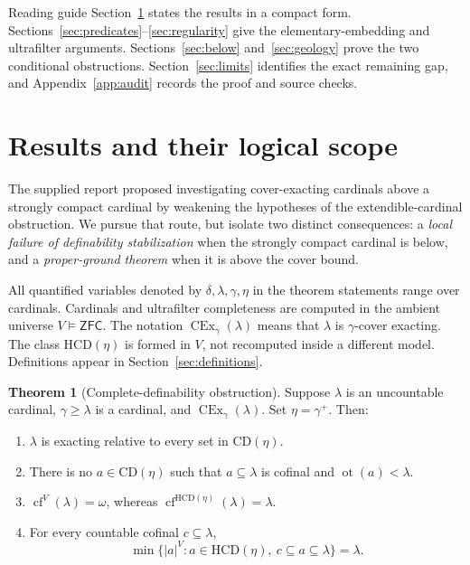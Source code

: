 \documentclass[11pt,letterpaper]{article}
\theoremstyle{definition}
\newtheorem{theorem}[definition]{Theorem}
\newcommand{\ZFC}{\mathsf{ZFC}}
\newcommand{\CEx}{\operatorname{CEx}}
\newcommand{\cf}{\operatorname{cf}}
\newcommand{\ot}{\operatorname{ot}}
\newcommand{\CD}{\mathrm{CD}}
\newcommand{\HCD}{\mathrm{HCD}}
\begin{document}
\clearpage
\tableofcontents
\vspace{10pt}
\begin{assessment}{Reading guide}
Section~\ref{sec:results} states the results in a compact form. Sections~\ref{sec:predicates}--\ref{sec:regularity} give the elementary-embedding and ultrafilter arguments. Sections~\ref{sec:below} and~\ref{sec:geology} prove the two conditional obstructions. Section~\ref{sec:limits} identifies the exact remaining gap, and Appendix~\ref{app:audit} records the proof and source checks.
\end{assessment}

\clearpage
\section{Results and their logical scope}\label{sec:results}

The supplied report \cite{supplied} proposed investigating cover-exacting cardinals above a strongly compact cardinal by weakening the hypotheses of the extendible-cardinal obstruction. We pursue that route, but isolate two distinct consequences: a \emph{local failure of definability stabilization} when the strongly compact cardinal is below, and a \emph{proper-ground theorem} when it is above the cover bound.

All quantified variables denoted by $\delta,\lambda,\gamma,\eta$ in the theorem statements range over cardinals. Cardinals and ultrafilter completeness are computed in the ambient universe $V\models\ZFC$. The notation $\CEx_\gamma(\lambda)$ means that $\lambda$ is $\gamma$-cover exacting. The class $\HCD(\eta)$ is formed in $V$, not recomputed inside a different model. Definitions appear in Section~\ref{sec:definitions}.

\begin{theorem}[Complete-definability obstruction]\label{thm:main}
Suppose $\lambda$ is an uncountable cardinal, $\gamma\ge\lambda$ is a cardinal, and $\CEx_\gamma(\lambda)$. Set $\eta=\gamma^+$. Then:
\begin{enumerate}
\item $\lambda$ is exacting relative to every set in $\CD(\eta)$.
\item There is no $a\in\CD(\eta)$ such that $a\subseteq\lambda$ is cofinal and $\ot(a)<\lambda$.
\item $\cf^V(\lambda)=\omega$, whereas $\cf^{\HCD(\eta)}(\lambda)=\lambda$.
\item For every countable cofinal $c\subseteq\lambda$,
\begin{equation}\label{eq:cover-gap-intro}
\min\bigl\{|a|^V:a\in\HCD(\eta),\ c\subseteq a\subseteq\lambda\bigr\}=\lambda.
\end{equation}
\end{enumerate}
\end{theorem}
\end{document}
